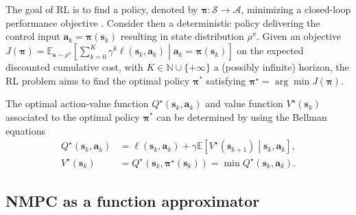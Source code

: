\documentclass[letterpaper, 10pt, conference]{ieeeconf}
\begin{document}
The goal of RL is to find a policy, denoted by $\boldsymbol{\pi}\colon\mathcal{S}\rightarrow\mathcal{A}$, minimizing a closed-loop performance objective \cite{sutton2018reinforcement}.
Consider then a deterministic policy delivering the control input $\mathbf{a}_k = \boldsymbol{\pi}(\mathbf{s}_k)$ resulting in state distribution $\rho^\pi$.
Given an objective $J(\boldsymbol{\pi}) = \mathbb{E}_{\mathbf{s} \sim \rho^\pi}\left[\sum_{k=0}^{K} \gamma^k \ell\left(\mathbf{s}_k, \mathbf{a}_k\right)\middle|\mathbf{a}_k=\boldsymbol{\pi}(\mathbf{s}_k)\right]$ on the expected discounted cumulative cost, with $K\in\mathbb{N}\cup\{+\infty\}$ a (possibly infinite) horizon, the RL problem aims to find the optimal policy $\boldsymbol{\pi}^*$ satisfying $\boldsymbol{\pi}^{\star} = \arg\min J(\boldsymbol{\pi})$.

The optimal action-value function $Q^{\star}(\mathbf{s}_k, \mathbf{a}_k)$ and value function $V^{\star}(\mathbf{s}_k)$ associated to the optimal policy $\boldsymbol{\pi}^*$ can be determined by using the Bellman equations
\begin{equation}
	\begin{aligned}
		Q^{\star}(\mathbf{s}_k, \mathbf{a}_k) & =\ell(\mathbf{s}_k, \mathbf{a}_k) + \gamma\mathbb{E}\left[V^{\star}\left(\mathbf{s}_{k + 1}\right) \middle| \mathbf{s}_k, \mathbf{a}_k\right]\text{,}\\
		V^{\star}(\mathbf{s}_k) & = Q^{\star}\left(\mathbf{s}_k, \boldsymbol{\pi}^{\star}(\mathbf{s}_k)\right) = \min Q^{\star}(\mathbf{s}_k, \mathbf{a}_k).
	\end{aligned}
\end{equation}

	\subsection{NMPC as a function approximator}
		\label{subsection:nmpc}
\end{document}
